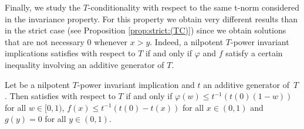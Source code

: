Finally, we study the $T$-conditionality with respect to the same t-norm considered in the invariance property. For this property we obtain very different results than in the strict case (see Proposition \ref{prop:strict:(TC)}) since we obtain solutions that are not necessary $0$ whenever $x>y$. Indeed, a nilpotent $T$-power invariant implications satisfies \TC with respect to $T$ if and only if $\varphi$ and $f$ satisfy a certain inequality involving an additive generator of $T$.
\begin{proposition}\label{Nilpotent:(TC)}
	Let \IT be a nilpotent $T$-power invariant implication and $t$ an additive generator of~$T$. Then \IT satisfies  \TC with respect to $T$ if and only if $\varphi(w) \leq t^{-1} \left(t(0)(1-w)\right)$ for all $w \in [0,1)$, $f(x) \leq t^{-1}(t(0)-t(x))$ for all $x \in (0,1)$ and $g(y)=0$ for all $y \in (0,1)$.
\end{proposition}
